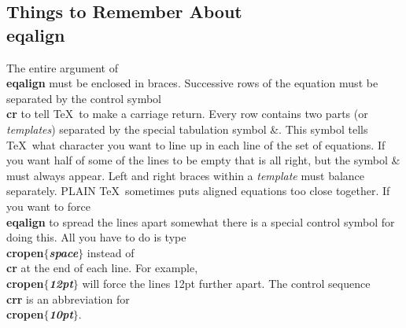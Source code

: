 \subsection{Things to Remember About {\bf \\eqalign}}
 
\pointbegin
The entire argument of {\bf \\eqalign} must be enclosed in braces.
Successive rows of the equation must be separated by the control
symbol {\bf \\cr} to tell \TeX\ to make a carriage return.
\point
Every row contains two parts (or {\it templates}) separated
by the special tabulation symbol \&.
This symbol tells \TeX\ what character you want to line up in each
line of the set of equations.
If you want half of some of the lines to be empty that is all right,
but the symbol \& must always appear.
Left and right braces within a {\it template} must balance separately.
\point
PLAIN \TeX\ sometimes puts aligned equations too close together.
If you want to force {\bf \\eqalign} to spread the lines apart
somewhat there is a special control symbol for doing this.
All you have to do is type {\bf \\cropen$\{${\it space}$\}$}
instead of {\bf \\cr} at the end of each line.
For example, {\bf \\cropen$\{${\it 12pt}$\}$ } will force
the lines 12pt further apart.
The control sequence {\bf \\crr} is an abbreviation for
{\bf \\cropen$\{${\it 10pt}$\}$}.
 
